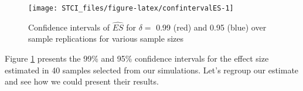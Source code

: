 \documentclass[]{book}
\newenvironment{Shaded}{\begin{snugshade}}{\end{snugshade}}
\newcommand{\CommentTok}[1]{\textcolor[rgb]{0.56,0.35,0.01}{\textit{#1}}}
\newcommand{\DataTypeTok}[1]{\textcolor[rgb]{0.13,0.29,0.53}{#1}}
\newcommand{\DecValTok}[1]{\textcolor[rgb]{0.00,0.00,0.81}{#1}}
\newcommand{\KeywordTok}[1]{\textcolor[rgb]{0.13,0.29,0.53}{\textbf{#1}}}
\newcommand{\NormalTok}[1]{#1}
\newcommand{\OperatorTok}[1]{\textcolor[rgb]{0.81,0.36,0.00}{\textbf{#1}}}
\newcommand{\StringTok}[1]{\textcolor[rgb]{0.31,0.60,0.02}{#1}}
\theoremstyle{definition}
\theoremstyle{definition}
\theoremstyle{definition}
\theoremstyle{remark}
\begin{document}
\begin{Shaded}
\end{Shaded}

\begin{figure}[htbp]

{\centering \texttt{[image: STCI\_files/figure-latex/confintervalES-1]} 

}

\caption{Confidence intervals of $\hat{ES}$ for $\delta=$ 0.99 (red) and 0.95 (blue) over sample replications for various sample sizes}\label{fig:confintervalES}
\end{figure}

Figure \ref{fig:confintervalES} presents the 99\% and 95\% confidence intervals for the effect size estimated in 40 samples selected from our simulations.
Let's regroup our estimate and see how we could present their results.
\end{document}
